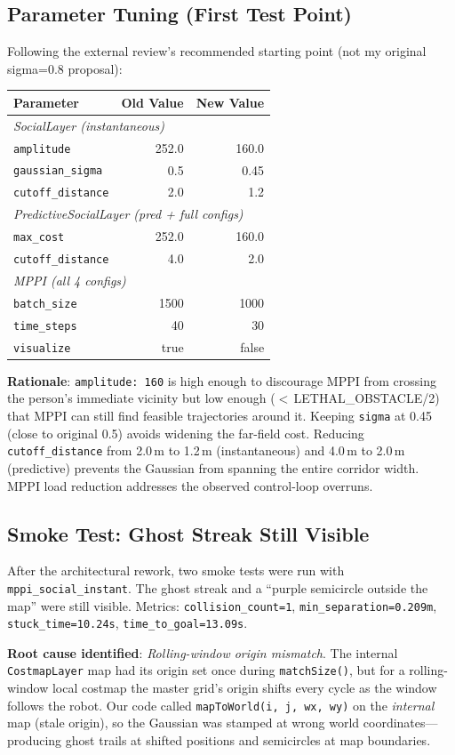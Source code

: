 \documentclass[11pt]{article}
\newcommand{\logentry}[1]{\subsection*{#1}}
\begin{document}
\logentry{Parameter Tuning (First Test Point)}
Following the external review's recommended starting point (not my original
sigma=0.8 proposal):

\begin{center}
\begin{tabular}{lrr}
\toprule
\textbf{Parameter} & \textbf{Old Value} & \textbf{New Value} \\
\midrule
\multicolumn{3}{l}{\emph{SocialLayer (instantaneous)}} \\
\texttt{amplitude} & 252.0 & 160.0 \\
\texttt{gaussian\_sigma} & 0.5 & 0.45 \\
\texttt{cutoff\_distance} & 2.0 & 1.2 \\
\midrule
\multicolumn{3}{l}{\emph{PredictiveSocialLayer (pred + full configs)}} \\
\texttt{max\_cost} & 252.0 & 160.0 \\
\texttt{cutoff\_distance} & 4.0 & 2.0 \\
\midrule
\multicolumn{3}{l}{\emph{MPPI (all 4 configs)}} \\
\texttt{batch\_size} & 1500 & 1000 \\
\texttt{time\_steps} & 40 & 30 \\
\texttt{visualize} & true & false \\
\bottomrule
\end{tabular}
\end{center}

\noindent\textbf{Rationale}: \texttt{amplitude: 160} is high enough to
discourage MPPI from crossing the person's immediate vicinity but low enough
($<$\,LETHAL\_OBSTACLE/2) that MPPI can still find feasible trajectories around
it. Keeping \texttt{sigma} at 0.45 (close to original 0.5) avoids widening the
far-field cost. Reducing \texttt{cutoff\_distance} from 2.0\,m to 1.2\,m
(instantaneous) and 4.0\,m to 2.0\,m (predictive) prevents the Gaussian from
spanning the entire corridor width. MPPI load reduction addresses the observed
control-loop overruns.

\logentry{Smoke Test: Ghost Streak Still Visible}
After the architectural rework, two smoke tests were run with
\texttt{mppi\_social\_instant}. The ghost streak and a ``purple semicircle
outside the map'' were still visible. Metrics: \texttt{collision\_count=1},
\texttt{min\_separation=0.209m}, \texttt{stuck\_time=10.24s},
\texttt{time\_to\_goal=13.09s}.

\textbf{Root cause identified}: \emph{Rolling-window origin mismatch}.
The internal \texttt{CostmapLayer} map had its origin set once during
\texttt{matchSize()}, but for a rolling-window local costmap the master grid's
origin shifts every cycle as the window follows the robot. Our code called
\texttt{mapToWorld(i, j, wx, wy)} on the \emph{internal} map (stale origin),
so the Gaussian was stamped at wrong world coordinates---producing ghost trails
at shifted positions and semicircles at map boundaries.
\end{document}
